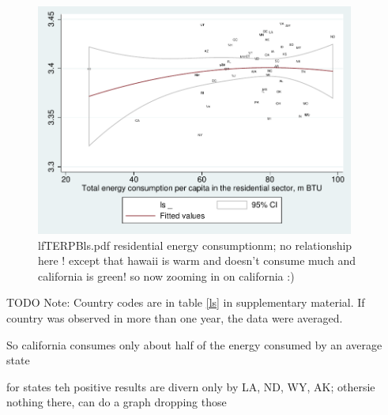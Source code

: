 \documentclass[10pt, letterpaper]{article}
\begin{document}
\begin{spacing}{1.4}
\begin{figure}[H]
 \includegraphics[height=3in]{graphsAndTables/lfTERPBls.pdf}\centering
\caption{lfTERPBls.pdf residential energy consumptionm; no relationship here !
  except that hawaii is warm and doesn't consume much and california is green!
  so now zooming in on california :)}\label{grComTETPBgdp}
\end{figure}
{\scriptsize TODO Note: Country codes are in table \ref{ls} in supplementary
  material. If country was observed in more than one year, the data were averaged.}


So california consumes only about half of the energy consumed by an average
state %


for states teh positive results are divern only by LA, ND, WY, AK; othersie
nothing there, can do a graph dropping those




\end{spacing}
\end{document}
